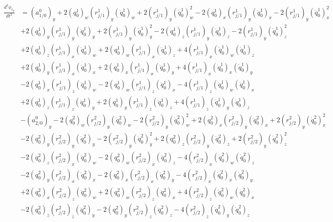 \documentclass{article}
\begin{document}
\begin{align}
    \begin{split}
        \frac{d^2\phi_{r_y}}{dt^2} &= (a_{1/0}^0)_y + 2(q_0^1)_w(r_{j/1}^1)_y(\ddot{q}_0^1)_w + 2(r_{j/1}^1)_y(\dot{q}_0^1)_w^2 - 2(q_0^1)_x(r_{j/1}^1)_y(\ddot{q}_0^1)_x - 2(r_{j/1}^1)_y(\dot{q}_0^1)_x^2 \\
                                   &+ 2(q_0^1)_y(r_{j/1}^1)_y(\ddot{q}_0^1)_y + 2(r_{j/1}^1)_y(\dot{q}_0^1)_y^2 - 2(q_0^1)_z(r_{j/1}^1)_y(\ddot{q}_0^1)_z - 2(r_{j/1}^1)_y(\dot{q}_0^1)_z^2 \\
                                   &+ 2(q_0^1)_z(r_{j/1}^1)_x(\ddot{q}_0^1)_w + 2(q_0^1)_w(r_{j/1}^1)_x(\ddot{q}_0^1)_z + 4(r_{j/1}^1)_x(\dot{q}_0^1)_w(\dot{q}_0^1)_z \\
                                   &+ 2(q_0^1)_y(r_{j/1}^1)_x(\ddot{q}_0^1)_x + 2(q_0^1)_x(r_{j/1}^1)_x(\ddot{q}_0^1)_y + 4(r_{j/1}^1)_x(\dot{q}_0^1)_x(\dot{q}_0^1)_y \\
                                   &- 2(q_0^1)_x(r_{j/1}^1)_z(\ddot{q}_0^1)_w - 2(q_0^1)_w(r_{j/1}^1)_z(\ddot{q}_0^1)_x - 4(r_{j/1}^1)_z(\dot{q}_0^1)_w(\dot{q}_0^1)_x \\
                                   &+ 2(q_0^1)_z(r_{j/1}^1)_z(\ddot{q}_0^1)_y + 2(q_0^1)_y(r_{j/1}^1)_z(\ddot{q}_0^1)_z + 4(r_{j/1}^1)_z(\dot{q}_0^1)_y(\dot{q}_0^1)_z \\
                                   &- (a_{2/0}^0)_y - 2(q_0^2)_w(r_{j/2}^2)_y(\ddot{q}_0^2)_w - 2(r_{j/2}^2)_y(\dot{q}_0^2)_w^2 + 2(q_0^2)_x(r_{j/2}^2)_y(\ddot{q}_0^2)_x + 2(r_{j/2}^2)_y(\dot{q}_0^2)_x^2 \\
                                   &- 2(q_0^2)_y(r_{j/2}^2)_y(\ddot{q}_0^2)_y - 2(r_{j/2}^2)_y(\dot{q}_0^2)_y^2 + 2(q_0^2)_z(r_{j/2}^2)_y(\ddot{q}_0^2)_z + 2(r_{j/2}^2)_y(\dot{q}_0^2)_z^2 \\
                                   &- 2(q_0^2)_z(r_{j/2}^2)_x(\ddot{q}_0^2)_w - 2(q_0^2)_w(r_{j/2}^2)_x(\ddot{q}_0^2)_z - 4(r_{j/2}^2)_x(\dot{q}_0^2)_w(\dot{q}_0^2)_z \\
                                   &- 2(q_0^2)_y(r_{j/2}^2)_x(\ddot{q}_0^2)_x - 2(q_0^2)_x(r_{j/2}^2)_x(\ddot{q}_0^2)_y - 4(r_{j/2}^2)_x(\dot{q}_0^2)_x(\dot{q}_0^2)_y \\
                                   &+ 2(q_0^2)_x(r_{j/2}^2)_z(\ddot{q}_0^2)_w + 2(q_0^2)_w(r_{j/2}^2)_z(\ddot{q}_0^2)_x + 4(r_{j/2}^2)_z(\dot{q}_0^2)_w(\dot{q}_0^2)_x \\
                                   &- 2(q_0^2)_z(r_{j/2}^2)_z(\ddot{q}_0^2)_y - 2(q_0^2)_y(r_{j/2}^2)_z(\ddot{q}_0^2)_z - 4(r_{j/2}^2)_z(\dot{q}_0^2)_y(\dot{q}_0^2)_z 
    \end{split}
\end{align}
\end{document}
